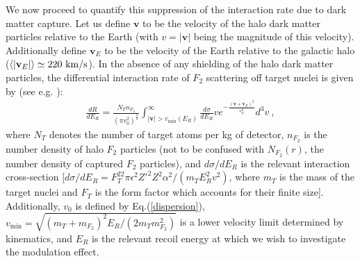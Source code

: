 \documentclass[12pt]{article}
\begin{document}
We now proceed to quantify this suppression of the interaction rate due to dark matter capture. Let us define $\mathbf{v}$ to be the velocity of the halo dark matter particles relative to the Earth (with $v = |\mathbf{v}|$ being the magnitude of this velocity). Additionally define $\mathbf{v}_E$ to be the velocity of the Earth relative to the galactic halo ($\langle |\mathbf{v} _E| \rangle \simeq 220 \ \rm km/s$). In the absence of any shielding of the halo dark matter particles, the differential interaction rate of $F_2$ scattering off target nuclei is given by (see e.g. \cite{footdiurnal}):
%
\begin{eqnarray}
\frac{dR}{dE _R} = \frac{N _Tn _{F_2}}{(\pi v _0 ^2) ^{\frac{3}{2}}}\int _{|\mathbf{v}| > v _{\min}(E _R)} ^{\infty} \frac{d\sigma}{dE _R}ve ^{-\frac{(\mathbf{v} + \mathbf{v} _E) ^2}{v _0 ^2}} d^3v \ ,
\label{drder}
\end{eqnarray}
%
where $N _T$ denotes the number of target atoms per kg of detector, $n _{F_2}$ is the number density of halo $F_2$ particles (not to be confused with $N _{F_2}(r)$, the number density of captured $F_2$ particles), and $d\sigma /dE _R$ is the relevant interaction cross-section [$d\sigma/dE _R = F_T ^22\pi \epsilon ^2{Z'} ^2Z ^2\alpha ^2/(m _TE _R ^2v ^2)$, where $m_T$ is the mass of the target nuclei and $F_T$ is the form factor which accounts for their finite size]. Additionally, $v _0$ is defined by Eq.(\ref{dispersion}), $v _{\min} = \sqrt{(m _T + m _{F_2}) ^2E _R/(2m _Tm _{F_2} ^2)}$ is a lower velocity limit determined by kinematics, and $E_R$ is the relevant recoil energy at which we wish to investigate the modulation effect. 
\end{document}
